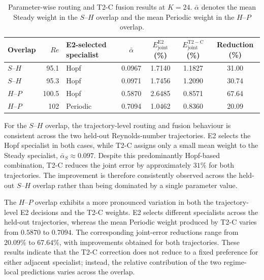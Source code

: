 \begin{table}[htbp]
\centering
\caption{Parameter-wise routing and T2-C fusion results at $K=24$.
$\bar{\alpha}$ denotes the mean Steady weight in the $S$--$H$ overlap and
the mean Periodic weight in the $H$--$P$ overlap.}
\label{tab:centered_square_fusion_parameter}

\small
\renewcommand{\arraystretch}{1.10}
\setlength{\tabcolsep}{7pt}

\begin{tabular}{@{}lr l c ccc@{}}
\toprule
Overlap
& $Re$
& E2-selected specialist
& $\bar{\alpha}$
& $E_{\mathrm{joint}}^{\mathrm{E2}}$ (\%)
& $E_{\mathrm{joint}}^{\mathrm{T2-C}}$ (\%)
& Reduction (\%) \\
\midrule

$S$--$H$
& 95.1
& Hopf
& 0.0967
& 1.7140
& 1.1827
& 31.00 \\

$S$--$H$
& 95.3
& Hopf
& 0.0971
& 1.7456
& 1.2090
& 30.74 \\

$H$--$P$
& 100.5
& Hopf
& 0.5870
& 2.6485
& 0.8571
& 67.64 \\

$H$--$P$
& 102
& Periodic
& 0.7094
& 1.0462
& 0.8360
& 20.09 \\

\bottomrule
\end{tabular}
\end{table}

For the $S$--$H$ overlap, the trajectory-level routing and fusion behaviour
is consistent across the two held-out Reynolds-number trajectories. E2
selects the Hopf specialist in both cases, while T2-C assigns only a small
mean weight to the Steady specialist,
$\bar{\alpha}_S\approx0.097$. Despite this predominantly Hopf-based
combination, T2-C reduces the joint error by approximately $31\%$ for both
trajectories. The improvement is therefore consistently observed across the
held-out $S$--$H$ overlap rather than being dominated by a single parameter
value.

The $H$--$P$ overlap exhibits a more pronounced variation in both the
trajectory-level E2 decisions and the T2-C weights. E2 selects different
specialists across the held-out trajectories, whereas the mean Periodic
weight produced by T2-C varies from $0.5870$ to $0.7094$. The corresponding
joint-error reductions range from $20.09\%$ to $67.64\%$, with improvements
obtained for both trajectories. These results indicate that the T2-C
correction does not reduce to a fixed preference for either adjacent
specialist; instead, the relative contribution of the two regime-local
predictions varies across the overlap.

